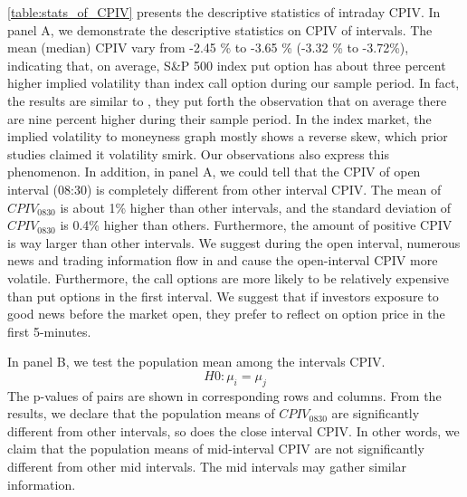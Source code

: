 \autoref{table:stats_of_CPIV} presents the descriptive statistics of intraday CPIV. In panel A, we demonstrate the descriptive statistics on CPIV of intervals. The mean (median) CPIV vary from -2.45 \% to -3.65 \% (-3.32 \% to -3.72\%), indicating that, on average, S\&P 500 index put option has about three percent higher implied volatility than index call option during our sample period. In fact, the results are similar to \textcite{atilgan2015implied}, they put forth the observation that on average there are nine percent higher during their sample period. In the index market, the implied volatility to moneyness graph mostly shows a reverse skew, which prior studies \parencite{zhang2008implied} claimed it volatility smirk. Our observations also express this phenomenon. In addition, in panel A, we could tell that the CPIV of open interval (08:30) is completely different from other interval CPIV. The mean of $CPIV_{0830}$ is about 1\% higher than other intervals, and the standard deviation of $CPIV_{0830}$ is 0.4\% higher than others. Furthermore, the amount of positive CPIV is way larger than other intervals. We suggest during the open interval, numerous news and trading information flow in and cause the open-interval CPIV more volatile. Furthermore, the call options are more likely to be relatively expensive than put options in the first interval. We suggest that if investors exposure to good news before the market open, they prefer to reflect on option price in the first 5-minutes.  

In panel B, we test the population mean among the intervals CPIV. 
\begin{equation}
H0: \mu _{i} = \mu _{j}
\end{equation}
The p-values of pairs are shown in corresponding rows and columns. From the results, we declare that the population means of $CPIV_{0830}$ are significantly different from other intervals, so does the close interval CPIV. In other words, we claim that the population means of mid-interval CPIV are not significantly different from other mid intervals. The mid intervals may gather similar information. 






%


